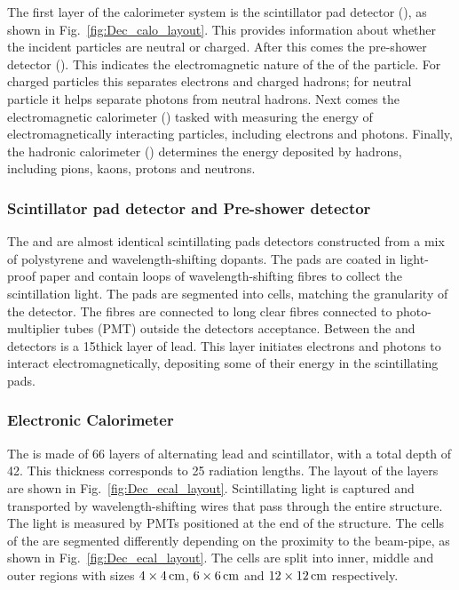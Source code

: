 The first layer of the calorimeter system is the scintillator pad detector (\spd), as shown in Fig.~\ref{fig:Dec_calo_layout}. This provides information about whether the incident particles are neutral or charged. After this comes the pre-shower detector (\presh). This indicates the electromagnetic nature of the of the particle. For charged particles this separates electrons and charged hadrons; for neutral particle it helps separate photons from neutral hadrons. Next comes the electromagnetic calorimeter (\ecal) tasked with measuring the energy of electromagnetically interacting particles, including electrons and photons. Finally, the hadronic calorimeter (\hcal) determines the energy deposited by hadrons, including pions, kaons, protons and neutrons. 

\subsubsection{Scintillator pad detector and Pre-shower detector}

The \spd and \presh are almost identical scintillating pads detectors constructed from a mix of polystyrene and wavelength-shifting dopants. The pads are coated in light-proof paper and contain loops of wavelength-shifting fibres to collect the scintillation light. The pads are segmented into cells, matching the granularity of the \ecal detector.
The fibres are connected to long clear fibres connected to photo-multiplier tubes (PMT) outside the detectors acceptance. Between the \spd and \presh detectors is a 15\mm thick layer of lead. This layer initiates electrons and photons to interact electromagnetically, depositing some of their energy in the \presh scintillating pads.    


\subsubsection{Electronic Calorimeter}


The \ecal is made of 66 layers of alternating lead and scintillator, with a total depth of 42\cm. This thickness corresponds to 25 radiation lengths. The layout of the layers are shown in Fig.~\ref{fig:Dec_ecal_layout}. Scintillating light is captured and transported by wavelength-shifting wires that pass through the entire structure. The light is measured by PMTs positioned at the end of the structure. The cells of the \ecal are segmented differently depending on the proximity to the beam-pipe, as shown in Fig.~\ref{fig:Dec_ecal_layout}. The cells are split into inner, middle and outer regions with sizes $4\times 4\mathrm{ \,cm}$, $6\times 6\mathrm{ \,cm}$ and $12\times 12\mathrm{ \,cm}$ respectively. 

